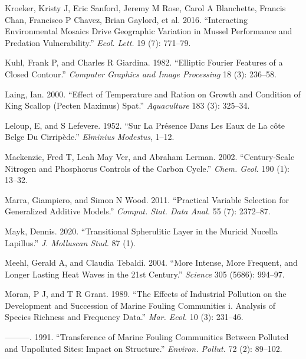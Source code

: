 \documentclass[smallextended]{svjour3}       %
\newlength{\cslhangindent}
\newenvironment{CSLReferences}[2] %
 {%
  \setlength{\parindent}{0pt}
  \ifodd #1 \everypar{\setlength{\hangindent}{\cslhangindent}}\ignorespaces\fi
  \ifnum #2 > 0
  \setlength{\parskip}{#2\baselineskip}
  \fi
 }%
 {}
\begin{document}
\begin{CSLReferences}{1}{0}
\leavevmode{}%
Kroeker, Kristy J, Eric Sanford, Jeremy M Rose, Carol A Blanchette,
Francis Chan, Francisco P Chavez, Brian Gaylord, et al. 2016.
{``Interacting Environmental Mosaics Drive Geographic Variation in
Mussel Performance and Predation Vulnerability.''} \emph{Ecol. Lett.} 19
(7): 771--79.

\leavevmode{}%
Kuhl, Frank P, and Charles R Giardina. 1982. {``Elliptic Fourier
Features of a Closed Contour.''} \emph{Computer Graphics and Image
Processing} 18 (3): 236--58.

\leavevmode{}%
Laing, Ian. 2000. {``Effect of Temperature and Ration on Growth and
Condition of King Scallop (Pecten Maximus) Spat.''} \emph{Aquaculture}
183 (3): 325--34.

\leavevmode{}%
Leloup, E, and S Lefevere. 1952. {``Sur La Pr{é}sence Dans Les Eaux de
La c{ô}te Belge Du Cirrip{è}de.''} \emph{Elminius Modestus}, 1--12.

\leavevmode{}%
Mackenzie, Fred T, Leah May Ver, and Abraham Lerman. 2002.
{``Century-Scale Nitrogen and Phosphorus Controls of the Carbon
Cycle.''} \emph{Chem. Geol.} 190 (1): 13--32.

\leavevmode{}%
Marra, Giampiero, and Simon N Wood. 2011. {``Practical Variable
Selection for Generalized Additive Models.''} \emph{Comput. Stat. Data
Anal.} 55 (7): 2372--87.

\leavevmode{}%
Mayk, Dennis. 2020. {``Transitional Spherulitic Layer in the Muricid
Nucella Lapillus.''} \emph{J. Molluscan Stud.} 87 (1).

\leavevmode{}%
Meehl, Gerald A, and Claudia Tebaldi. 2004. {``More Intense, More
Frequent, and Longer Lasting Heat Waves in the 21st Century.''}
\emph{Science} 305 (5686): 994--97.

\leavevmode{}%
Moran, P J, and T R Grant. 1989. {``The Effects of Industrial Pollution
on the Development and Succession of Marine Fouling Communities i.
Analysis of Species Richness and Frequency Data.''} \emph{Mar. Ecol.} 10
(3): 231--46.

\leavevmode{}%
---------. 1991. {``Transference of Marine Fouling Communities Between
Polluted and Unpolluted Sites: Impact on Structure.''} \emph{Environ.
Pollut.} 72 (2): 89--102.


\end{CSLReferences}
\end{document}
